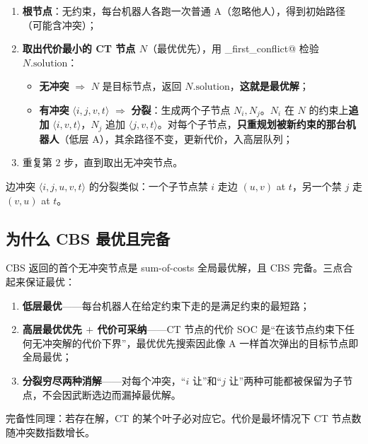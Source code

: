 \begin{algo}\label{algo:mapf-cbs}
\begin{enumerate}
  \item \textbf{根节点}：无约束，每台机器人各跑一次普通 A\*（忽略他人），得到初始路径（可能含冲突）；
  \item \textbf{取出代价最小的 CT 节点 $N$}（最优优先），用 \verb@find_first_conflict@ 检验 $N.\mathrm{solution}$：
    \begin{itemize}
      \item \textbf{无冲突} $\Rightarrow$ $N$ 是目标节点，返回 $N.\mathrm{solution}$，\textbf{这就是最优解}；
      \item \textbf{有冲突} $\langle i,j,v,t\rangle$ $\Rightarrow$ \textbf{分裂}：生成两个子节点 $N_i,N_j$。$N_i$ 在 $N$ 的约束上\textbf{追加} $\langle i,v,t\rangle$，$N_j$ 追加 $\langle j,v,t\rangle$。对每个子节点，\textbf{只重规划被新约束的那台机器人}（低层 A\*），其余路径不变，更新代价，入高层队列；
    \end{itemize}
  \item 重复第 $2$ 步，直到取出无冲突节点。
\end{enumerate}
边冲突 $\langle i,j,u,v,t\rangle$ 的分裂类似：一个子节点禁 $i$ 走边 $(u,v)$ at $t$，另一个禁 $j$ 走 $(v,u)$ at $t$。
\end{algo}

\subsection{为什么 CBS 最优且完备}
\label{sec:mapf-cbs-optimal}

\begin{theorem}\label{thm:mapf-cbs}
CBS 返回的首个无冲突节点是 sum-of-costs 全局最优解，且 CBS 完备\cite{sharon2015cbs}。三点合起来保证最优：
\begin{enumerate}
  \item \textbf{低层最优}——每台机器人在给定约束下走的是满足约束的最短路；
  \item \textbf{高层最优优先 $+$ 代价可采纳}——CT 节点的代价 SOC 是“在该节点约束下任何无冲突解的代价下界”，最优优先搜索因此像 A\* 一样首次弹出的目标节点即全局最优；
  \item \textbf{分裂穷尽两种消解}——对每个冲突，“$i$ 让”和“$j$ 让”两种可能都被保留为子节点，不会因武断选边而漏掉最优解。
\end{enumerate}
完备性同理：若存在解，CT 的某个叶子必对应它。代价是最坏情况下 CT 节点数随冲突数指数增长。
\end{theorem}

